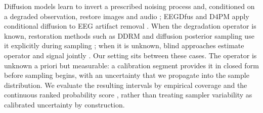 Diffusion models learn to invert a prescribed noising process \cite{ho2020ddpm,song2021scoresde} and, conditioned on a degraded observation, restore images and audio \cite{saharia2022palette,richter2023storm}; EEGDfus and D4PM apply conditional diffusion to EEG artifact removal \cite{huang2025eegdfus,shao2025d4pm}. When the degradation operator is known, restoration methods such as DDRM and diffusion posterior sampling use it explicitly during sampling \cite{kawar2022ddrm,chung2023dps}; when it is unknown, blind approaches estimate operator and signal jointly \cite{chung2023blinddps,murata2023gibbsddrm}. Our setting sits between these cases. The operator is unknown a priori but measurable: a calibration segment provides it in closed form before sampling begins, with an uncertainty that we propagate into the sample distribution. We evaluate the resulting intervals by empirical coverage and the continuous ranked probability score \cite{gneiting2007strictly}, rather than treating sampler variability as calibrated uncertainty by construction.
